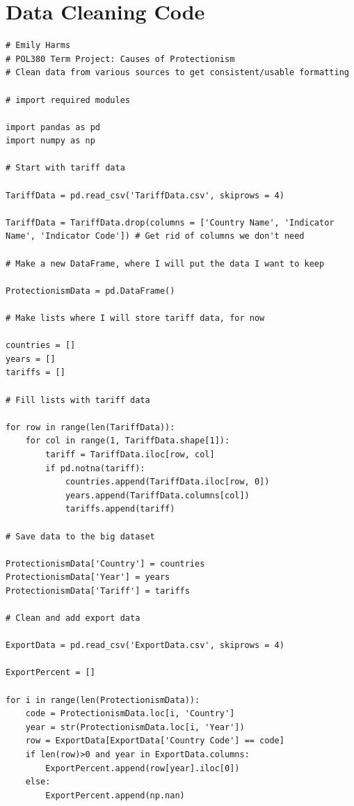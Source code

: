 \documentclass[11pt]{article}
\begin{document}
\appendix 

\section{Data Cleaning Code} 

\begin{lstlisting}
# Emily Harms
# POL380 Term Project: Causes of Protectionism
# Clean data from various sources to get consistent/usable formatting

# import required modules

import pandas as pd
import numpy as np

# Start with tariff data

TariffData = pd.read_csv('TariffData.csv', skiprows = 4)

TariffData = TariffData.drop(columns = ['Country Name', 'Indicator Name', 'Indicator Code']) # Get rid of columns we don't need

# Make a new DataFrame, where I will put the data I want to keep

ProtectionismData = pd.DataFrame()

# Make lists where I will store tariff data, for now

countries = []
years = []
tariffs = []

# Fill lists with tariff data

for row in range(len(TariffData)):
    for col in range(1, TariffData.shape[1]):
        tariff = TariffData.iloc[row, col]
        if pd.notna(tariff):
            countries.append(TariffData.iloc[row, 0])
            years.append(TariffData.columns[col])
            tariffs.append(tariff)

# Save data to the big dataset

ProtectionismData['Country'] = countries
ProtectionismData['Year'] = years
ProtectionismData['Tariff'] = tariffs

# Clean and add export data 

ExportData = pd.read_csv('ExportData.csv', skiprows = 4)

ExportPercent = []

for i in range(len(ProtectionismData)):
    code = ProtectionismData.loc[i, 'Country']
    year = str(ProtectionismData.loc[i, 'Year'])
    row = ExportData[ExportData['Country Code'] == code]
    if len(row)>0 and year in ExportData.columns:
        ExportPercent.append(row[year].iloc[0])
    else:
        ExportPercent.append(np.nan)


\end{lstlisting}
\end{document}
